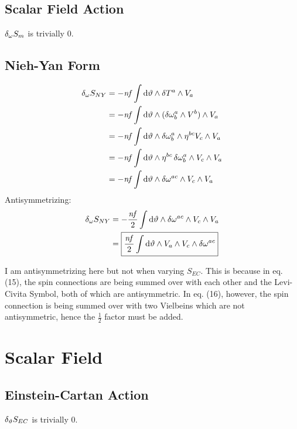 \documentclass[12pt]{article}
\begin{document}
\subsection{Scalar Field Action}
$\var_\omega{S_m}$ is trivially $0$.

\subsection{Nieh-Yan Form}
\begin{align*}
  \var_\omega{S_{NY}} &= -\mathit{nf} \int \dd{\vartheta} \wedge \var{T^a} \wedge V_a \\
  &= -\mathit{nf} \int \dd{\vartheta} \wedge (\var{\omega^a_b} \wedge V^b) \wedge V_a \\
  &= -\mathit{nf} \int \dd{\vartheta} \wedge \var{\omega^a_b} \wedge \eta^{bc}V_c \wedge V_a \\
  &= -\mathit{nf} \int \dd{\vartheta} \wedge \eta^{bc}\var{\omega^a_b} \wedge V_c \wedge V_a \\
  &= -\mathit{nf} \int \dd{\vartheta} \wedge \var{\omega^{ac}} \wedge V_c \wedge V_a \\
\end{align*}
Antisymmetrizing:
\begin{align}
  \var_\omega{S_{NY}} &= -\frac{\mathit{nf}}{2} \int \dd{\vartheta} \wedge \var{\omega^{ac}} \wedge V_c \wedge V_a \nonumber \\
  &= \boxed{\frac{\mathit{nf}}{2} \int \dd{\vartheta} \wedge V_a \wedge V_c \wedge \var{\omega^{ac}}}
\end{align}

I am antisymmetrizing here but not when varying $S_{EC}$. This is because in eq. (15), the spin connections are being summed over with each other and the Levi-Civita Symbol, both of which are antisymmetric. In eq. (16), however, the spin connection is being summed over with two Vielbeins which are not antisymmetric, hence the $\frac{1}{2}$ factor must be added.

\section{Scalar Field}
\subsection{Einstein-Cartan Action}
$\var_\vartheta{S_{EC}}$ is trivially 0.
\end{document}
